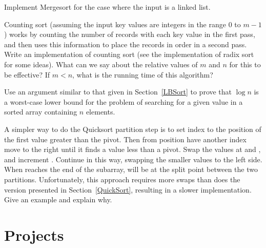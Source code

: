 \begin{exercises}
\item
Implement Mergesort for the case where the
input is a linked list.

\item
Counting sort (assuming the input key values are integers in the range
0 to $m-1$) works by counting the number of records with each key
value in the first pass, and then uses this information to place the
records in order in a second pass.
Write an implementation of counting sort (see the implementation of
radix sort for some ideas).
What can we say about the relative values of $m$ and $n$ for this to
be effective?
If $m < n$, what is the running time of this algorithm?

\item
\label{BinSearchBound}
Use an argument similar to that given in Section~\ref{LBSort} to prove
that \(\log n\) is a worst-case lower bound for the problem of searching
for a given value in a sorted array containing \(n\) elements.

\item
A simpler way to do the Quicksort partition step is to
set index  to the position of the first value greater than
the pivot.
Then from position  have another index  move
to the right until it finds a value less than a pivot.
Swap the values at  and , and increment
.
Continue in this way, swapping the smaller values to the left side.
When  reaches the end of the subarray,  will be
at the split point between the two partitions.
Unfortunately, this approach requires more swaps than does the
version presented in Section~\ref{QuickSort}, resulting in a slower
implementation.
Give an example and explain why.

\end{exercises}

\section{Projects}

